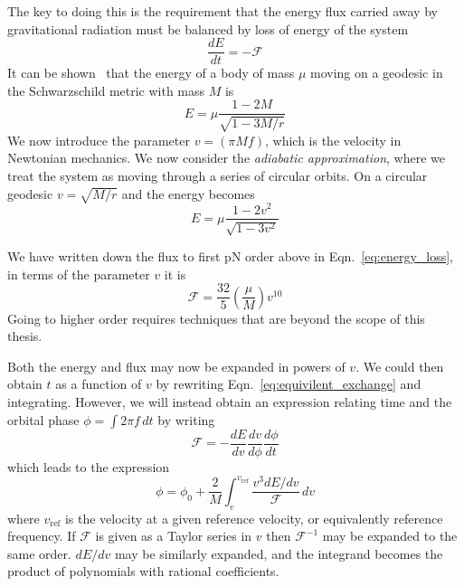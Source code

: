 The key to doing this is the requirement that the energy flux carried
away by gravitational radiation must be balanced by loss of energy of the
system
%
\begin{equation}
\label{eq:equivilent_exchange}
\frac{dE}{dt} = - \mathcal{F}
\end{equation}
%
It can be shown~\cite{mtw} that the energy of a body of mass $\mu$ moving
on a geodesic in the Schwarzschild metric with mass $M$ is
%
\begin{equation}
\label{eq:hamiltonian}
E = \mu \frac{1-2M}{\sqrt{1-3M/r}} 
\end{equation}
%
We now introduce the parameter $v = (\pi M f)$, which is the velocity
in Newtonian mechanics.  We now consider the \emph{adiabatic
approximation}, where we treat the system as moving through a series
of circular orbits.  On a circular geodesic $v= \sqrt{M/r}$ and the
energy becomes
%
\begin{equation}
E = \mu \frac{1-2v^2}{\sqrt{1-3v^2}} 
\end{equation}

We have written down the flux to first pN order above in
Eqn.~\ref{eq:energy_loss}, in terms of the parameter $v$ it is
%
\begin{equation}
\mathcal{F} = \frac{32}{5} \left( \frac{\mu}{M} \right) v^{10}
\end{equation}
%
Going to higher order requires techniques that are beyond the scope of
this thesis.

Both the energy and flux may now be expanded in powers of $v$.  We
could then obtain $t$ as a function of $v$ by rewriting
Eqn.~\ref{eq:equivilent_exchange} and integrating.  However, we
will instead obtain an expression relating time and the orbital phase
$\phi = \int 2\pi f\, dt$ by writing
%
\begin{equation*}
\mathcal{F} = - \frac{dE}{dv} \frac{dv}{d\phi} \frac{d\phi}{dt}
\end{equation*}
%
which leads to the expression
%
\begin{equation}
\label{eq:expansion_for_phi}
\phi = \phi_0 + \frac{2}{M} \int_v^{v_\mathrm{ref}} \frac{v^3
dE/dv}{\mathcal{F}}\, dv
\end{equation}
%
where $v_\mathrm{ref}$ is the velocity at a given reference velocity,
or equivalently reference frequency.  If $\mathcal{F}$ is given as a
Taylor series in $v$ then $\mathcal{F}^{-1}$ may be expanded to the
same order.  $dE/dv$ may be similarly expanded, and the integrand
becomes the product of polynomials with rational coefficients.


